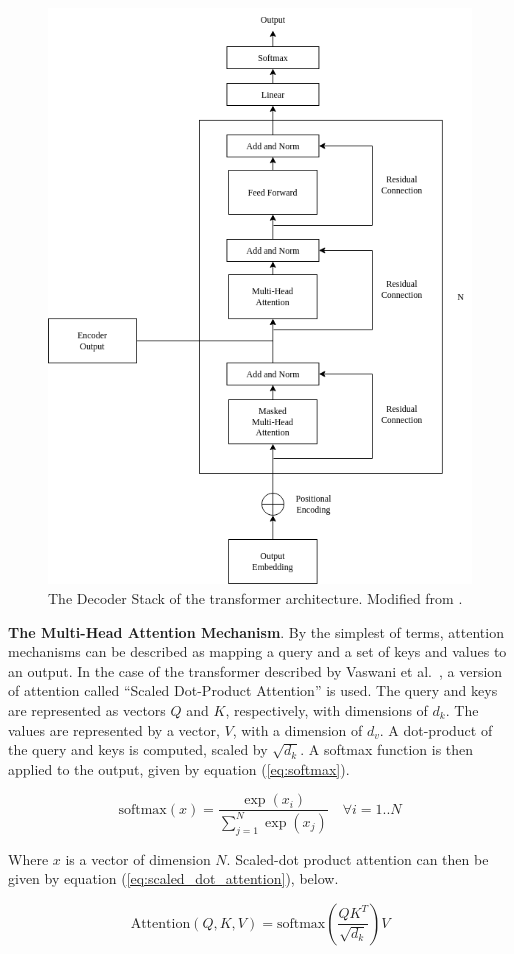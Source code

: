 \documentclass[12pt]{article}
\begin{document}
\begin{figure}
    \centering
    \includegraphics[width=0.6\linewidth]{figures/transformer_decoder_stack.png}
    \caption{The Decoder Stack of the transformer architecture. Modified from \cite{vaswani_attention_2017}.}
    \label{fig:transformer_decoder_stack}
\end{figure}

\textbf{The Multi-Head Attention Mechanism}. By the simplest of terms, attention mechanisms can be described as mapping a query and a set of keys and
values to an output. In the case of the transformer described by Vaswani et al.~\cite{vaswani_attention_2017}, a version of attention called ``Scaled
Dot-Product Attention'' is used. The query and keys are represented as vectors $Q$ and $K$, respectively, with dimensions of $d_k$. The values are
represented by a vector, $V$, with a dimension of $d_v$. A dot-product of the query and keys is computed, scaled by $\sqrt{d_k}$. A softmax function
is then applied to the output, given by equation (\ref{eq:softmax}).

\begin{equation}\label{eq:softmax}
    \mbox{softmax}(x) = \frac{\exp(x_i)}{\sum_{j=1}^{N}\exp(x_j)} \quad \forall i=1..N
\end{equation}

\noindent
Where $x$ is a vector of dimension $N$. Scaled-dot product attention can then be given by equation (\ref{eq:scaled_dot_attention}), below.

\begin{equation}\label{eq:scaled_dot_attention}
    \mbox{Attention}(Q,K,V) = \mbox{softmax}\left(\frac{QK^T}{\sqrt{d_k}}\right)V
\end{equation}
\end{document}
